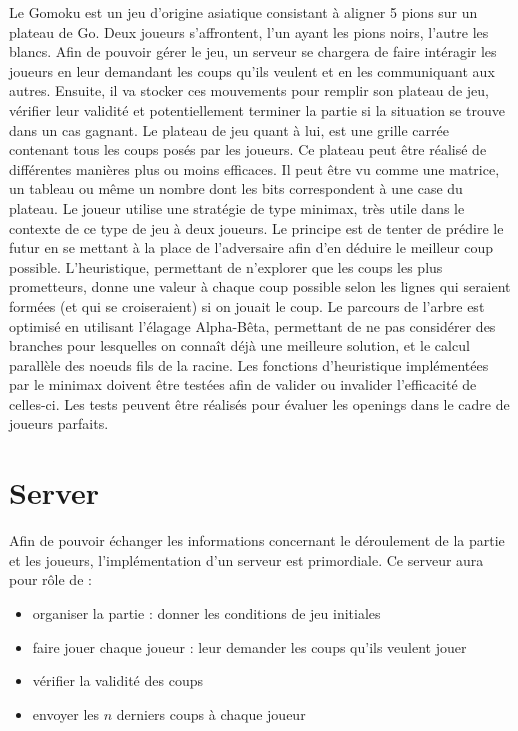 \documentclass[a4paper,11pt]{article}
\begin{document}
Le Gomoku est un jeu d'origine asiatique consistant à aligner 5 pions sur un plateau de Go. Deux joueurs s'affrontent, l'un ayant les pions noirs, l'autre les blancs.
Afin de pouvoir gérer le jeu, un serveur se chargera de faire intéragir les joueurs en leur demandant les coups qu'ils veulent et en les communiquant aux autres. Ensuite, il va stocker ces mouvements pour remplir son plateau de jeu, vérifier leur validité et potentiellement terminer la partie si la situation se trouve dans un cas gagnant.
Le plateau de jeu quant à lui, est une grille carrée contenant tous les coups posés par les joueurs. Ce plateau peut être réalisé de différentes manières plus ou moins efficaces. Il peut être vu comme une matrice, un tableau ou même un nombre dont les bits correspondent à une case du plateau.
Le joueur utilise une stratégie de type minimax, très utile dans le contexte de ce type de jeu à deux joueurs. Le principe est de tenter de prédire le futur en se mettant à la place de l'adversaire afin d'en déduire le meilleur coup possible. L'heuristique, permettant de n'explorer que les coups les plus prometteurs, donne une valeur à chaque coup possible selon les lignes qui seraient formées (et qui se croiseraient) si on jouait le coup. Le parcours de l'arbre est optimisé en utilisant l'élagage Alpha-Bêta, permettant de ne pas considérer des branches pour lesquelles on connaît déjà une meilleure solution, et le calcul parallèle des noeuds fils de la racine.
Les fonctions d'heuristique implémentées par le minimax doivent être testées afin de valider ou invalider l'efficacité de celles-ci. Les tests peuvent être réalisés pour évaluer les openings dans le cadre de joueurs parfaits.


\section{Server}
\label{sct:server}

Afin de pouvoir échanger les informations concernant le déroulement de la partie et les joueurs, l'implémentation d'un serveur est primordiale. Ce serveur aura pour rôle de :

\begin{itemize}
    \item organiser la partie : donner les conditions de jeu initiales
    \item faire jouer chaque joueur : leur demander les coups qu'ils veulent jouer
    \item vérifier la validité des coups
    \item envoyer les $n$ derniers coups à chaque joueur
\end{itemize}
\end{document}
